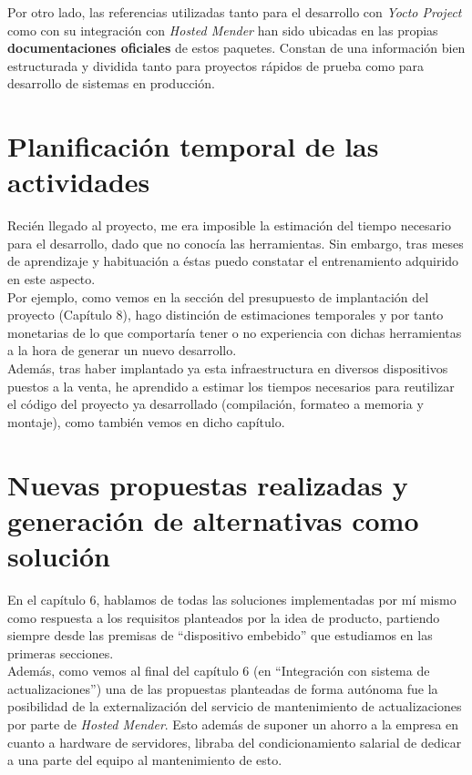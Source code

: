 Por otro lado, las referencias utilizadas tanto para el desarrollo con \textit{Yocto Project} como con su integración con \textit{Hosted Mender} han sido ubicadas en las propias \textbf{documentaciones oficiales} de estos paquetes. Constan de una información bien estructurada y dividida tanto para proyectos rápidos de prueba como para desarrollo de sistemas en producción.

\section{Planificación temporal de las actividades}

Recién llegado al proyecto, me era imposible la estimación del tiempo necesario para el desarrollo, dado que no conocía las herramientas. Sin embargo, tras meses de aprendizaje y habituación a éstas puedo constatar el entrenamiento adquirido en este aspecto.\\

Por ejemplo, como vemos en la sección del presupuesto de implantación del proyecto (Capítulo 8), hago distinción de estimaciones temporales y por tanto monetarias de lo que comportaría tener o no experiencia con dichas herramientas a la hora de generar un nuevo desarrollo.\\

Además, tras haber implantado ya esta infraestructura en diversos dispositivos puestos a la venta, he aprendido a estimar los tiempos necesarios para reutilizar el código del proyecto ya desarrollado (compilación, formateo a memoria y montaje), como también vemos en dicho capítulo.

\section{Nuevas propuestas realizadas y generación de alternativas como solución}

En el capítulo 6, hablamos de todas las soluciones implementadas por mí mismo como respuesta a los requisitos planteados por la idea de producto, partiendo siempre desde las premisas de ``dispositivo embebido'' que estudiamos en las primeras secciones.\\

Además, como vemos al final del capítulo 6 (en ``Integración con sistema de actualizaciones'') una de las propuestas planteadas de forma autónoma fue la posibilidad de la externalización del servicio de mantenimiento de actualizaciones por parte de \textit{Hosted Mender}. Esto además de suponer un ahorro a la empresa en cuanto a hardware de servidores, libraba del condicionamiento salarial de dedicar a una parte del equipo al mantenimiento de esto.

